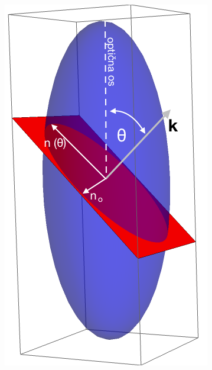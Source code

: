 \documentclass[longbibliography,slovene,a4paper,12pt]{book}
\begin{document}
\begin{figure}[h!]
	\centering
	\begin{subfigure}[b]{0.25\textwidth}
	\includegraphics[width=\textwidth]{slike/ellipsoid.png}
	\label{fig:indexellipsoid}
	\end{subfigure}\qquad
	\begin{subfigure}[b]{0.6\textwidth}

\end{subfigure}
\end{figure}
\end{document}

